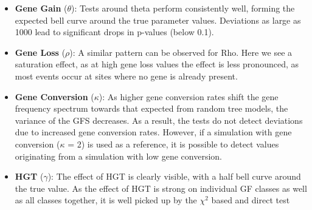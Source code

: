 \begin{itemize}
    \item \textbf{Gene Gain} ($\theta$): Tests around theta perform consistently well, forming the expected bell curve around the true parameter values.
          Deviations as large as 1000 lead to significant drops in p-values (below 0.1).
    \item \textbf{Gene Loss} ($\rho$): A similar pattern can be observed for Rho. Here we see a saturation effect, as at high gene loss values the effect is less pronounced,
          as most events occur at sites where no gene is already present.
    \item \textbf{Gene Conversion} ($\kappa$): As higher gene conversion rates shift the gene frequency spectrum towards that expected from random tree models, the variance of the \ac{GFS} decreases.
          As a result, the tests do not detect deviations due to increased gene conversion rates.
          However, if a simulation with gene conversion ($\kappa$ = 2) is used as a reference, it is possible to detect values originating from a simulation with low gene conversion.
    \item \textbf{HGT} ($\gamma$): The effect of \ac{HGT} is clearly visible, with a half bell curve around the true value.
          As the effect of \ac{HGT} is strong on individual GF classes as well as all classes together, it is well picked up by the $\chi^2$ based and direct test
\end{itemize}
